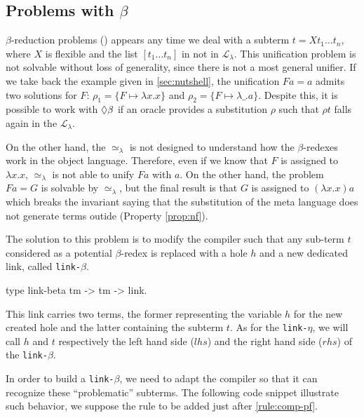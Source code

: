 \documentclass[sigconf,natbib=false,review]{acmart}
\newcommand{\UnifRel}{\ensuremath{\simeq}}
\newcommand{\Ue}{\ensuremath{\UnifRel_\lambda}\xspace}
\newcommand{\llambda}{\ensuremath{\mathcal{L}_\lambda}\xspace}
\newcommand{\linkbeta}{\texttt{link-}\ensuremath{\beta}\xspace}
\newcommand{\linketa}{\texttt{link-}\ensuremath{\eta}\xspace}
\begin{document}
\subsection{Problems with $\beta$}

$\beta$-reduction problems (\maybebeta) appears any time we deal with a subterm $t
= X t_1 \dots t_n$, where $X$ is flexible and the list $[t_1 \dots t_n]$ in not
in \llambda. This unification problem is not solvable without loss of
generality, since there is not a most general unifier. If we take back the
example given in \cref{sec:nutshell}, the unification $F a = a$ admits two solutions for $F$:
$\rho_1 = \{F \mapsto \lambda x.x\}$ and $\rho_2 = \{F \mapsto \lambda \_.a\}$.
Despite this, it is possible to work with $\Diamond\beta$ if an oracle provides a
substitution $\rho$ such that $\rho t$ falls again in the \llambda. 

On the other hand, the \Ue is not designed to understand how the $\beta$-redexes
work in the object language. Therefore, even if we know that $F$ is assigned
to $\lambda x.x$, \Ue is not able to unify $F a$ with $a$. On the other hand,
the problem $F a = G$ is solvable by \Ue, but the final result is that $G$ is
assigned to $(\lambda x.x) a$ which breaks the invariant saying that the 
substitution of the meta language does not generate terms outide \wellb{} (Property \ref{prop:nf}).

The solution to this problem is to modify the compiler such that any sub-term $t$
considered as a potential $\beta$-redex is replaced with a hole $h$ and a new dedicated
link, called \linkbeta.

\begin{elpicode}
  type link-beta tm -> tm -> link.
\end{elpicode}

\def\rhs{\ensuremath{rhs}\xspace}
\def\lhs{\ensuremath{lhs}\xspace}
  
This link carries two terms, the former representing the variable $h$ for the
new created hole and the latter containing the subterm $t$. As for the \linketa,
we will call $h$ and $t$ respectively the left hand side (\lhs)
and the right hand side (\rhs) of the \linkbeta.

In order to build a \linkbeta, we need to adapt the compiler so that it can
recognize these ``problematic'' subterms. The following code snippet illustrate
such behavior, we suppose the rule to be added just after \cref{rule:comp-pf}.


\end{document}
